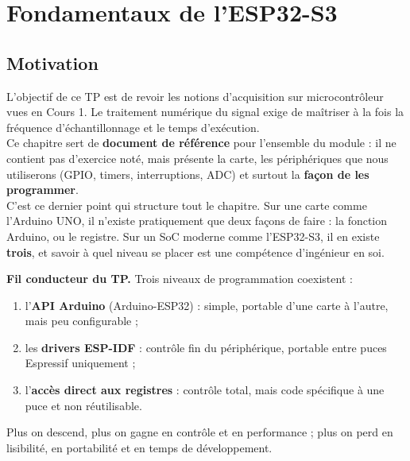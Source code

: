 %
%

\chapter{Fondamentaux de l'ESP32-S3}

\section*{Motivation}

L'objectif de ce TP est de revoir les notions d'acquisition sur microcontrôleur vues en Cours 1. Le traitement numérique du signal exige de maîtriser à la fois la fréquence d'échantillonnage et le temps d'exécution.\\

Ce chapitre sert de \textbf{document de référence} pour l'ensemble du module : il ne contient pas d'exercice noté, mais présente la carte, les périphériques que nous utiliserons (GPIO, timers, interruptions, ADC) et surtout la \textbf{façon de les programmer}.\\

C'est ce dernier point qui structure tout le chapitre. Sur une carte comme l'Arduino UNO, il n'existe pratiquement que deux façons de faire : la fonction Arduino, ou le registre. Sur un SoC moderne comme l'ESP32-S3, il en existe \textbf{trois}, et savoir à quel niveau se placer est une compétence d'ingénieur en soi.

\begin{imp}
\textbf{Fil conducteur du TP.} Trois niveaux de programmation coexistent :
\begin{enumerate}
    \item l'\textbf{API Arduino} (Arduino-ESP32) : simple, portable d'une carte à l'autre, mais peu configurable ;
    \item les \textbf{drivers ESP-IDF} : contrôle fin du périphérique, portable entre puces Espressif uniquement ;
    \item l'\textbf{accès direct aux registres} : contrôle total, mais code spécifique à une puce et non réutilisable.
\end{enumerate}
Plus on descend, plus on gagne en contrôle et en performance ; plus on perd en lisibilité, en portabilité et en temps de développement.
\end{imp}

